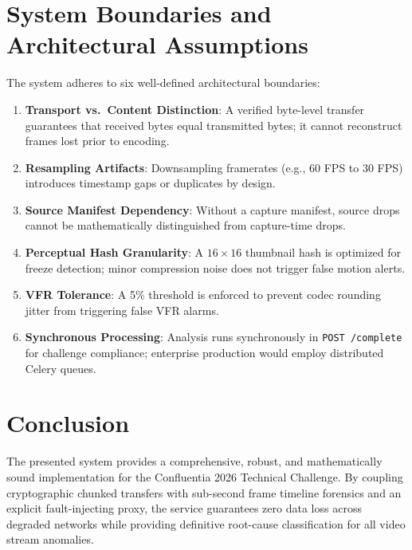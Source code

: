 \documentclass[11pt,a4paper]{article}
\begin{document}
\section{System Boundaries and Architectural Assumptions}

The system adheres to six well-defined architectural boundaries:
\begin{enumerate}[leftmargin=*,itemsep=1pt]
    \item \textbf{Transport vs.\ Content Distinction}: A verified byte-level transfer guarantees that received bytes equal transmitted bytes; it cannot reconstruct frames lost prior to encoding.
    \item \textbf{Resampling Artifacts}: Downsampling framerates (e.g., 60 FPS to 30 FPS) introduces timestamp gaps or duplicates by design.
    \item \textbf{Source Manifest Dependency}: Without a capture manifest, source drops cannot be mathematically distinguished from capture-time drops.
    \item \textbf{Perceptual Hash Granularity}: A $16 \times 16$ thumbnail hash is optimized for freeze detection; minor compression noise does not trigger false motion alerts.
    \item \textbf{VFR Tolerance}: A 5\% threshold is enforced to prevent codec rounding jitter from triggering false VFR alarms.
    \item \textbf{Synchronous Processing}: Analysis runs synchronously in \texttt{POST /complete} for challenge compliance; enterprise production would employ distributed Celery queues.
\end{enumerate}

\section{Conclusion}
The presented system provides a comprehensive, robust, and mathematically sound implementation for the Confluentia 2026 Technical Challenge. By coupling cryptographic chunked transfers with sub-second frame timeline forensics and an explicit fault-injecting proxy, the service guarantees zero data loss across degraded networks while providing definitive root-cause classification for all video stream anomalies.
\end{document}
